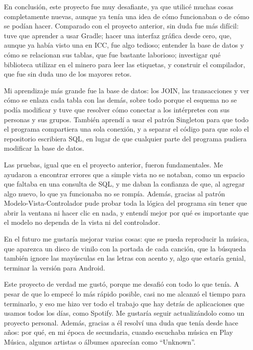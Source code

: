 \documentclass[12pt,letterpaper]{article}
\begin{document}
En conclusión, este proyecto fue muy desafiante, ya que utilicé muchas
cosas completamente nuevas, aunque ya tenía una idea de cómo funcionaban o
de cómo se podían hacer. Comparado con el proyecto anterior, sin duda fue
más difícil: tuve que aprender a usar Gradle; hacer una interfaz gráfica
desde cero, que, aunque ya había visto una en ICC, fue algo tedioso;
entender la base de datos y cómo se relacionan sus tablas, que fue
bastante laborioso; investigar qué biblioteca utilizar en el minero para
leer las etiquetas, y construir el compilador, que fue sin duda uno de los
mayores retos.

Mi aprendizaje más grande fue la base de datos: los JOIN, las
transacciones y ver cómo se enlaza cada tabla con las demás, sobre todo
porque el esquema no se podía modificar y tuve que resolver cómo conectar
a los intérpretes con sus personas y sus grupos. También aprendí a usar el
patrón Singleton para que todo el programa compartiera una sola conexión,
y a separar el código para que solo el repositorio escribiera SQL, en
lugar de que cualquier parte del programa pudiera modificar la base de
datos.

Las pruebas, igual que en el proyecto anterior, fueron fundamentales. Me
ayudaron a encontrar errores que a simple vista no se notaban, como un
espacio que faltaba en una consulta de SQL, y me daban la confianza de
que, al agregar algo nuevo, lo que ya funcionaba no se rompía. Además,
gracias al patrón Modelo-Vista-Controlador pude probar toda la lógica del
programa sin tener que abrir la ventana ni hacer clic en nada, y entendí
mejor por qué es importante que el modelo no dependa de la vista ni del
controlador.

En el futuro me gustaría mejorar varias cosas: que se pueda reproducir la
música, que aparezca un disco de vinilo con la portada de cada canción,
que la búsqueda también ignore las mayúsculas en las letras con acento y,
algo que estaría genial, terminar la versión para Android.

Este proyecto de verdad me gustó, porque me desafió con todo lo que tenía.
A pesar de que lo empecé lo más rápido posible, casi no me alcanzó el
tiempo para terminarlo, y eso me hizo ver todo el trabajo que hay detrás
de aplicaciones que usamos todos los días, como Spotify. Me gustaría
seguir actualizándolo como un proyecto personal. Además, gracias a él
resolví una duda que tenía desde hace años: por qué, en mi época de
secundaria, cuando escuchaba música en Play Música, algunos artistas o
álbumes aparecían como ``Unknown''.
\end{document}
